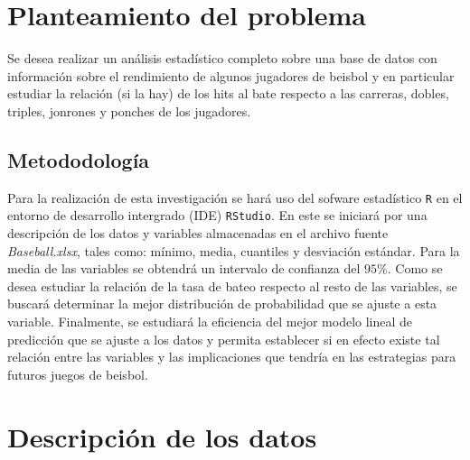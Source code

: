 \documentclass{staprojteamusb}
\begin{document}
	
	
	\maketitle
	
	
	
	\hypertarget{planteamiento-del-problema}{%
 \section{Planteamiento del problema}\label{planteamiento-del-problema}}

 Se desea realizar un análisis estadístico completo sobre una base de
 datos con información sobre el rendimiento de algunos jugadores de
 beisbol y en particular estudiar la relación (si la hay) de los hits al
 bate respecto a las carreras, dobles, triples, jonrones y ponches de
 los jugadores.

 \hypertarget{metododologuxeda}{%
 \subsection{Metododología}\label{metododologuxeda}}

 Para la realización de esta investigación se hará uso del sofware
 estadístico \texttt{R} en el entorno de desarrollo intergrado (IDE)
 \texttt{RStudio}. En este se iniciará por una descripción de los datos
 y variables almacenadas en el archivo fuente \emph{Baseball.xlsx},
 tales como: mínimo, media, cuantiles y desviación estándar. Para la
 media de las variables se obtendrá un intervalo de confianza del
 \(95\%\). Como se desea estudiar la relación de la tasa de bateo
 respecto al resto de las variables, se buscará determinar la mejor
 distribución de probabilidad que se ajuste a esta variable. Finalmente,
 se estudiará la eficiencia del mejor modelo lineal de predicción que se
 ajuste a los datos y permita establecer si en efecto existe tal
 relación entre las variables y las implicaciones que tendría en las
 estrategias para futuros juegos de beisbol.

 \hypertarget{descripciuxf3n-de-los-datos}{%
 \section{Descripción de los datos}\label{descripciuxf3n-de-los-datos}}
\end{document}
